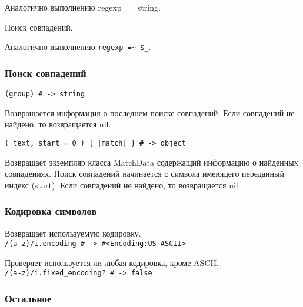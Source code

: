 \begin{methodlist}
  Аналогично выполнению regexp =~ string.

  Поиск совпадений.

  Аналогично выполнению \verb!regexp =~ $_!.
\end{methodlist}

\subsubsection*{Поиск совпадений}

\begin{methodlist}
  \verb!(group) # -> string!

  Возвращается информация о последнем поиске совпадений. Если совпадений не найдено, то возвращается nil. 

  \verb!( text, start = 0 ) { |match| } # -> object!

  Возвращает экземпляр класса MatchData содержащий информацию о найденных совпадениях. Поиск совпадений начинается с символа имеющего переданный индекс (start). Если совпадений не найдено, то возвращается nil.
\end{methodlist}

\subsubsection*{Кодировка символов}

\begin{methodlist}
  Возвращает используемую кодировку.
  \\\verb!/(a-z)/i.encoding # -> #<Encoding:US-ASCII>!

  Проверяет используется ли любая кодировка, кроме ASCII.
  \\\verb!/(a-z)/i.fixed_encoding? # -> false!
\end{methodlist}

\subsubsection*{Остальное}

